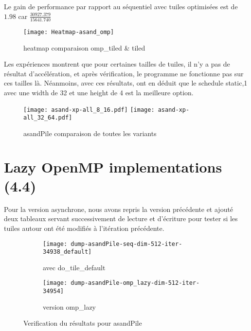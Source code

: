 \documentclass[10pt, a4paper]{article}
\begin{document}
Le gain de performance par rapport au séquentiel avec tuiles optimisées est de $1.98$ car $\frac{30927.379}{15641.740}$

\begin{figure}[H]
    \centering
    \texttt{[image: Heatmap-asand\_omp]}
    \caption{\small{heatmap comparaison omp\_tiled \& tiled}}
\end{figure}

Les expériences montrent que pour certaines tailles de tuiles, il n'y a pas de résultat d'accélération, et après vérification, le programme ne fonctionne pas sur ces tailles là.
Néanmoins, avec ces résultats, ont en déduit que le schedule static,1 avec une width de 32 et une height de 4 est la meilleure option.

\begin{figure}[H]
    \centering
    \texttt{[image: asand-xp-all\_8\_16.pdf]}
    \texttt{[image: asand-xp-all\_32\_64.pdf]}
    \caption{\small{asandPile comparaison de toutes les variants}}
\end{figure}

\section{Lazy OpenMP implementations (4.4)}

Pour la version asynchrone, nous avons repris la version précédente et ajouté deux tableaux
servant successivement de lecture et d'écriture pour tester si les tuiles autour ont été modifiés à l'itération précédente.

\begin{figure}[H]
    \centering
    \begin{subfigure}{.4\textwidth}
        \texttt{[image: dump-asandPile-seq-dim-512-iter-34938\_default]}
        \caption{\small{avec do\_tile\_default}}
    \end{subfigure}
    \begin{subfigure}{.4\textwidth}
        \texttt{[image: dump-asandPile-omp\_lazy-dim-512-iter-34954]}
        \caption{\small{version omp\_lazy}}
    \end{subfigure}
    \caption{Verification du résultats pour asandPile}
\end{figure}
\end{document}

